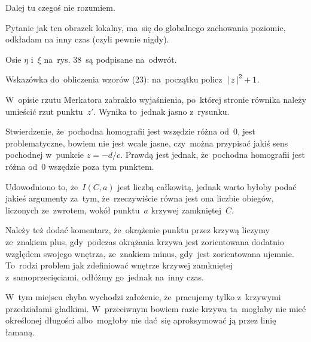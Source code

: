 \documentclass[a4paper,11pt]{article}
\begin{document}
Dalej tu czegoś nie rozumiem.

Pytanie jak ten obrazek lokalny, ma~się do globalnego zachowania
poziomic, odkładam na inny czas (czyli pewnie nigdy).

\vspace{\spaceFour}


\start {} Osie $\eta$ i~$\xi$ na~rys. 38~są podpisane na~odwrót.

\vspace{\spaceFour}


\start {} Wskazówka do~obliczenia wzorów (23): na~początku
policz~$\left| \,  z  \, \right|^{ 2 } + 1$.

\vspace{\spaceFour}


\start {} W~opisie rzutu Merkatora zabrakło wyjaśnienia,
po~której stronie równika należy umieścić rzut punktu~$z'$. Wynika
to~jednak jasno z~rysunku.

\vspace{\spaceFour}


\start {} Stwierdzenie, że~pochodna homografii jest wszędzie
różna od~0, jest problematyczne, bowiem nie jest wcale jasne,
czy~można przypisać jakiś sens pochodnej w~punkcie $z = -d / c$.
Prawdą jest jednak, że~pochodna homografii jest różna od~0 wszędzie
poza tym punktem.

\vspace{\spaceFour}


\start {} Udowodniono to, że~$I( C, a )$ jest liczbą
całkowitą, jednak warto byłoby podać jakieś argumenty za~tym,
że~rzeczywiście równa jest ona liczbie obiegów, liczonych ze~zwrotem,
wokół punktu~$a$ krzywej zamkniętej~$C$.

Należy też dodać komentarz, że~okrążenie punktu przez krzywą liczymy
ze~znakiem plus, gdy~podczas okrążania krzywa jest zorientowana
dodatnio względem swojego wnętrza, ze~znakiem minus, gdy~jest
zorientowana ujemnie. To~rodzi problem jak zdefiniować wnętrze krzywej
zamkniętej z~samoprzecięciami, odłóżmy go~jednak na~inny czas.

\vspace{\spaceFour}


\start {} W~tym miejscu chyba wychodzi założenie, że~pracujemy
tylko z~krzywymi przedziałami gładkimi. W~przeciwnym bowiem razie
krzywa ta~mogłaby nie mieć określonej długości albo~mogłoby nie
dać~się aproksymować ją przez linię łamaną.

\vspace{\spaceFour}
\end{document}
